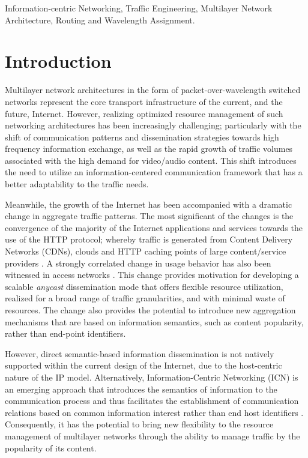 \documentclass[journal]{IEEEtran}
\begin{document}
\begin{IEEEkeywords}
Information-centric Networking, Traffic Engineering, Multilayer Network Architecture, Routing and Wavelength Assignment.
\end{IEEEkeywords}

\IEEEpeerreviewmaketitle

\section{Introduction}
Multilayer network architectures in the form of packet-over-wavelength
switched networks represent the core transport infrastructure of the
current, and the future, Internet. However, realizing optimized
resource management of such networking architectures has been
increasingly challenging; particularly with the shift of communication
patterns and dissemination strategies towards high frequency
information exchange, as well as the rapid growth of traffic volumes
associated with the high demand for video/audio content. This shift
introduces the need to utilize an information-centered communication
framework that has a better adaptability to the traffic needs.

Meanwhile, the growth of the Internet has been accompanied with a
dramatic change in aggregate traffic patterns. The most significant of
the changes is the convergence of the majority of the Internet
applications and services towards the use of the HTTP protocol;
whereby traffic is generated from Content Delivery Networks (CDNs),
clouds and HTTP caching points of large content/service providers
\cite{lab:trf, pop:ICnet,moc:trf}. A strongly correlated change in
usage behavior has also been witnessed in access networks
\cite{kih:trf}. This change provides motivation for developing a
scalable \emph{anycast} dissemination mode that offers flexible
resource utilization, realized for a broad range of traffic
granularities, and with minimal waste of resources. The change also provides the potential to introduce new aggregation mechanisms that are based on information semantics, such as content popularity, rather than end-point identifiers.

However, direct semantic-based information dissemination is not
natively supported within the current design of the Internet, due to
the host-centric nature of the IP model. Alternatively,
Information-Centric Networking (ICN) is an emerging approach that introduces the semantics of information to the communication process and thus facilitates the establishment of communication relations based on common information interest rather than end host identifiers \cite{tro:ICnet,jac:ICnetCACM,kop:ICnet}.
Consequently, it has the potential to bring new flexibility to the
resource management of multilayer networks through the ability to
manage traffic by the popularity of its content.
\end{document}
